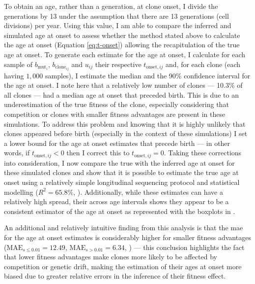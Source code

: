 To obtain an age, rather than a generation, at clone onset, I divide the generations by 13 under the assumption that there are 13 generations (cell divisions) per year. Using this value, I am able to compare the inferred and simulated age at onset to assess whether the method stated above to calculate the age at onset (Equation \eqref{eq:t-onset}) allowing the recapitulation of the true age at onset. To generate each estimate for the age at onset, I calculate for each sample of $b_{\mathrm{mut}_i}$, $b_{\mathrm{clone}_{ij}}$ and $u_{ij}$ their respective $t_{\mathrm{onset},ij}$ and, for each clone (each having $1,000$ samples), I estimate the median and the 90\% confidence interval for the age at onset. I note here that a relatively low number of clones --- 10.3\% of all clones --- had a median age at onset that preceded birth. This is due to an underestimation of the true fitness of the clone, especially considering that competition or clones with smaller fitness advantages are present in these simulations. To address this problem and knowing that it is highly unlikely that clones appeared before birth (especially in the context of these simulations) I set a lower bound for the age at onset estimates that precede birth --- in other words, if $t_{\mathrm{onset},ij} < 0$ then I correct this to $t_{\mathrm{onset},ij}=0$. Taking these corrections into consideration, I now compare the true with the inferred age at onset for these simulated clones and show that it is possible to estimate the true age at onset using a relatively simple longitudinal sequencing protocol and statistical modelling ($R^2 = 65.8\%$, ). Additionally, while these estimates can have a relatively high spread, their across age intervals shows they appear to be a consistent estimator of the age at onset as represented with the boxplots in . 

\begin{figure}[!ht]
	\label{fig:age-at-onset-sim}
\end{figure}

An additional and relatively intuitive finding from this analysis is that the \ac{mae} for the age at onset estimates is considerably higher for smaller fitness advantages ($\mathrm{MAE}_{s \leq 0.01} = 12.49$, $\mathrm{MAE}_{s > 0.01} = 6.34$, ) --- this conclusion highlights the fact that lower fitness advantages make clones more likely to be affected by competition or genetic drift, making the estimation of their ages at onset more biased due to greater relative errors in the inference of their fitness effect. 

